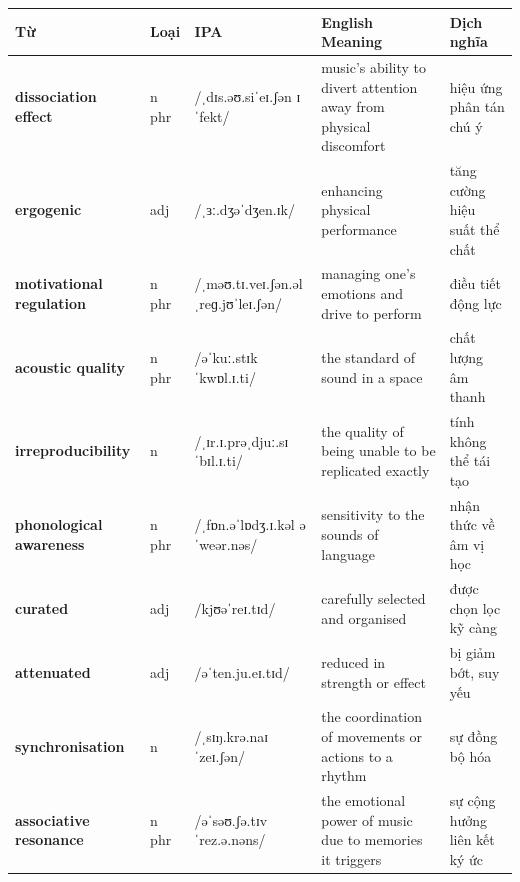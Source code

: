 \separator


\vspace{0.8em}
\begin{center}
\renewcommand{\arraystretch}{1.65}
\begin{tabularx}{\textwidth}{|V{0.22\textwidth}|C{0.07\textwidth}|I{0.20\textwidth}|Y|V{0.18\textwidth}|}
\hline
{}
\textbf{Từ} & \textbf{Loại} & \textbf{IPA} & \textbf{English Meaning} & \textbf{Dịch nghĩa} \\
\hline
\textbf{dissociation effect} & n phr & /ˌdɪs.əʊ.siˈeɪ.ʃən ɪˈfekt/ & music's ability to divert attention away from physical discomfort & hiệu ứng phân tán chú ý \\ \hline
\textbf{ergogenic} & adj & /ˌɜː.dʒəˈdʒen.ɪk/ & enhancing physical performance & tăng cường hiệu suất thể chất \\ \hline
\textbf{motivational regulation} & n phr & /ˌməʊ.tɪ.veɪ.ʃən.əl ˌreɡ.jʊˈleɪ.ʃən/ & managing one's emotions and drive to perform & điều tiết động lực \\ \hline
\textbf{acoustic quality} & n phr & /əˈkuː.stɪk ˈkwɒl.ɪ.ti/ & the standard of sound in a space & chất lượng âm thanh \\ \hline
\textbf{irreproducibility} & n & /ˌɪr.ɪ.prəˌdjuː.sɪˈbɪl.ɪ.ti/ & the quality of being unable to be replicated exactly & tính không thể tái tạo \\ \hline
\textbf{phonological awareness} & n phr & /ˌfɒn.əˈlɒdʒ.ɪ.kəl əˈweər.nəs/ & sensitivity to the sounds of language & nhận thức về âm vị học \\ \hline
\textbf{curated} & adj & /kjʊəˈreɪ.tɪd/ & carefully selected and organised & được chọn lọc kỹ càng \\ \hline
\textbf{attenuated} & adj & /əˈten.ju.eɪ.tɪd/ & reduced in strength or effect & bị giảm bớt, suy yếu \\ \hline
\textbf{synchronisation} & n & /ˌsɪŋ.krə.naɪˈzeɪ.ʃən/ & the coordination of movements or actions to a rhythm & sự đồng bộ hóa \\ \hline
\textbf{associative resonance} & n phr & /əˈsəʊ.ʃə.tɪv ˈrez.ə.nəns/ & the emotional power of music due to memories it triggers & sự cộng hưởng liên kết ký ức \\ \hline
\end{tabularx}
\end{center}

\newpage

